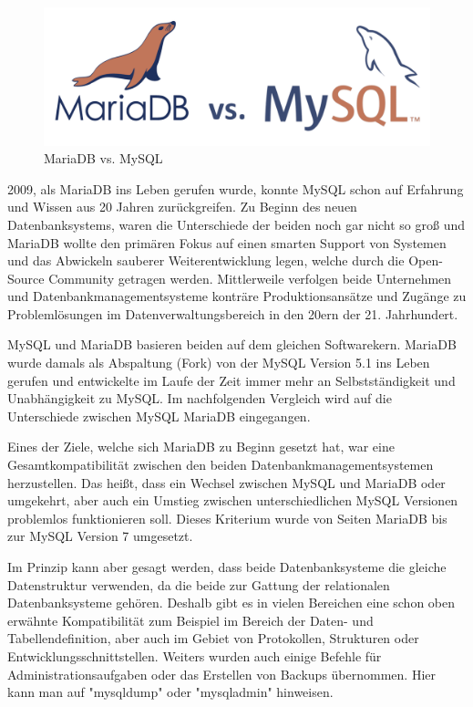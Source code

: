 
\begin{figure}[H]
    \centering
    \includegraphics[width=\textwidth]{media/MariaDB/mariavsmy.png}
    \caption{MariaDB vs. MySQL \cite{MariaVsMyBild}}
    \label{fig:MariavsMy}
\end{figure}

2009, als MariaDB ins Leben gerufen wurde, konnte MySQL schon auf Erfahrung und Wissen aus 20 Jahren zurückgreifen. Zu Beginn des neuen Datenbanksystems, waren die Unterschiede der beiden noch gar nicht so groß und MariaDB wollte den primären Fokus auf einen smarten Support von Systemen und das Abwickeln sauberer Weiterentwicklung legen, welche durch die Open-Source Community getragen werden. Mittlerweile verfolgen beide Unternehmen und Datenbankmanagementsysteme konträre Produktionsansätze und Zugänge zu Problemlösungen im Datenverwaltungsbereich in den 20ern der 21. Jahrhundert. \cite{MariaVsMy}

MySQL und MariaDB basieren beiden auf dem gleichen Softwarekern. MariaDB wurde damals als Abspaltung (Fork) von der MySQL Version 5.1 ins Leben gerufen und entwickelte im Laufe der Zeit immer mehr an Selbstständigkeit und Unabhängigkeit zu MySQL. Im nachfolgenden Vergleich wird auf die Unterschiede zwischen MySQL MariaDB eingegangen. \cite{MariaVsMy}


Eines der Ziele, welche sich MariaDB zu Beginn gesetzt hat, war eine Gesamtkompatibilität zwischen den beiden Datenbankmanagementsystemen herzustellen. Das heißt, dass ein Wechsel zwischen MySQL und MariaDB oder umgekehrt, aber auch ein Umstieg zwischen unterschiedlichen MySQL Versionen problemlos funktionieren soll. Dieses Kriterium wurde von Seiten MariaDB bis zur MySQL Version 7 umgesetzt. \cite{MariaVsMy}

Im Prinzip kann aber gesagt werden, dass beide Datenbanksysteme die gleiche Datenstruktur verwenden, da die beide zur Gattung der relationalen Datenbanksysteme gehören. Deshalb gibt es in vielen Bereichen eine schon oben erwähnte Kompatibilität zum Beispiel im Bereich der Daten- und Tabellendefinition, aber auch im Gebiet von Protokollen, Strukturen oder Entwicklungsschnittstellen. Weiters wurden auch einige Befehle für Administrationsaufgaben oder das Erstellen von Backups übernommen. Hier kann man auf "mysqldump" oder "mysqladmin" hinweisen. \cite{MariaVsMy}

